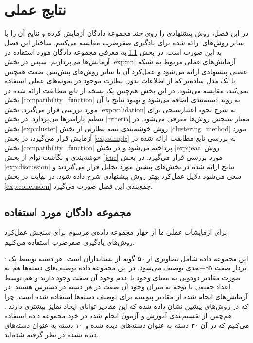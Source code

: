 \chapter{نتایج عملی} \label{chap:experiments}
در این فصل، روش پیشنهادی را روی چند مجموعه دادگان آزمایش کرده و نتایج آن را با سایر روش‌های ارائه شده برای یادگیری صفرضرب مقایسه می‌کنیم. ساختار این فصل به این صورت است:
 در بخش \ref{exp:datasets} به معرفی مجموعه دادگان مورد استفاده در آزمایش‌ها می‌پردازیم.
سپس در  بخش \ref{exp:nn} آزمایش‌های عملی مربوط به شبکه عصبی پیشنهادی ارائه می‌شود و عمل‌کرد آن با سایر روش‌های پیش‌بینی صفت همچنین با یک مدل ساده‌تر که از اطلاعات بدون نظارت موجود در نمونه‌های عملی استفاده نمی‌کند، مقایسه می‌شود. در این بخش هم‌چنین یک نسخه از  تابع مطابقت ارائه شده در بخش \ref{compatibility_function} به روند دسته‌بندی اضافه می‌شود و بهبود نتایج با آن مورد بررسی قرار می‌گیرد.
بخش \ref{exp:validation} به شرح نحوه اعتبارسنجی برای تنظیم پارامترها می‌پردازد.
در بخش \ref{criteria} معیار سنجش روش‌ها معرفی می‌شود.
 در بخش \ref{exp:cluster} روش خوشه‌بندی نیمه نظارتی از بخش \ref{clustering_method} مورد آزمایش قرار می‌گیرد،
  در بخش \ref{exp:simple} به بررسی تابع مطابقت ارائه شده  در بخش \ref{compatibility_function} پرداخته می‌شود
   و در بخش \ref{exp:jeac} روش خوشه‌بندی و نگاشت توام از بخش \ref{jeac} مورد بررسی قرار می‌گیرد.
    در بخش \ref{exp:discussion} نتایج ارائه شده در بخش‌های پیشین مورد تحلیل قرار می‌گیردند و سعی می‌شود دلایل عمل‌کرد بهتر روش پیشنهادی شرح داده شود.
    در نهایت در بخش \ref{exp:conclusion} جمع‌بندی این فصل صورت می‌گیرد.


\section{مجموعه دادگان مورد استفاده}\label{exp:datasets}
برای آزمایشات عملی ما از چهار مجموعه داده‌ی مرسوم برای سنجش عمل‌کرد روش‌های یادگیری صفرضرب استفاده می‌کنیم.

\textbf{} \cite{lampert09}:
این مجموعه داده شامل تصاویری از ۵۰ گونه از پستانداران است. هر دسته توسط یک بردار صفت $-85$بعدی توصیف می‌شود. در این مجموعه داده توصیف‌های دسته‌ها هم به صورت مقادیر دودویی به معنای وجود یا عدم وجود آن صفت وجود دارند و هم توسط اعداد حقیقی با توجه به میزان وجود آن صفت در هر دسته در دسترس هستند. در آزمایش‌های انجام شده از مقادیر پیوسته برای توصیف دسته‌ها استفاده شده است، چرا که در روش‌های پیشین نشان داده شده که این مقادیر توانای ایجاد تمایز بیشتری دارند \cite{Akata2015}. هم‌چنین از تقسیم‌بندی آموزش و آزمون انجام شده در خود مجموعه داده استفاده می‌کنیم که در آن ۴۰ دسته به عنوان دسته‌های دیده شده و ۱۰ دسته به عنوان
دسته‌های دیده نشده در نظر گرفته شده‌اند.


